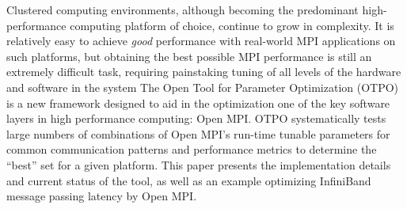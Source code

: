 Clustered computing environments, although becoming the predominant
high-performance computing platform of choice, continue to grow in
complexity.  
%
It is relatively easy to achieve {\em good} performance with
real-world MPI applications on such platforms, but obtaining the best
possible MPI performance is still an extremely difficult task,
requiring painstaking tuning of all levels of the hardware and
software in the system
%
The Open Tool for Parameter Optimization (OTPO) is a new framework
designed to aid in the optimization one of the key software layers in
high performance computing: Open MPI.
%
OTPO systematically tests large numbers of combinations of Open MPI's
run-time tunable parameters for common communication patterns and
performance metrics to determine the ``best'' set for a given
platform.
%
This paper presents the implementation details and current status of
the tool, as well as an example optimizing InfiniBand message passing
latency by Open MPI.

